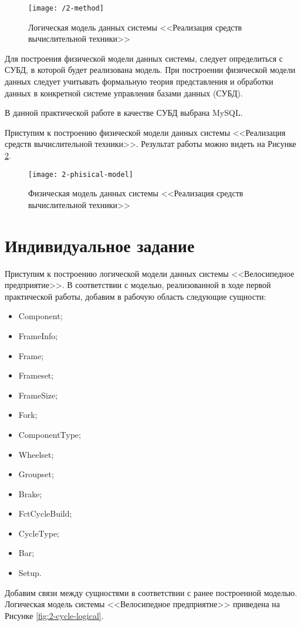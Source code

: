 \begin{figure}[htpb]
	\centering
	\texttt{[image: /2-method]}
	\caption{Логическая модель данных системы <<Реализация средств вычислительной техники>>}
	\label{fig:2-logical-model-method}
\end{figure}

Для построения физической модели данных системы, следует определиться с СУБД, в которой будет реализована модель. При построении физической модели данных следует учитывать формальную теория представления и обработки данных в конкретной системе управления базами данных (СУБД).

В данной практической работе в качестве СУБД выбрана MySQL.

Приступим к построению физической модели данных системы <<Реализация средств вычислительной техники>>. Результат работы можно видеть на Рисунке \ref{fig:2-phisical-model}.
\begin{figure}[ht]
	\centering
	\texttt{[image: 2-phisical-model]}
	\caption{Физическая модель данных системы <<Реализация средств вычислительной техники>>}
	\label{fig:2-phisical-model}
\end{figure}
\newpage
\section{Индивидуальное задание}
Приступим к построению логической модели данных системы <<Велосипедное предприятие>>. 
В соответствии с моделью, реализованной в ходе первой практической работы, добавим в рабочую область следующие сущности:
\begin{itemize}
	\item Component;
	\item FrameInfo;
	\item Frame;
	\item Frameset;
	\item FrameSize;
	\item Fork;
	\item ComponentType;
	\item Wheelset;
	\item Groupset;
	\item Brake;
	\item FctCycleBuild;
	\item CycleType;
	\item Bar;
	\item Setup.
\end{itemize}
Добавим связи между сущностями в соответствии с ранее построенной моделью. Логическая модель системы <<Велосипедное предприятие>> приведена на Рисунке \ref{fig:2-cycle-logical}.

